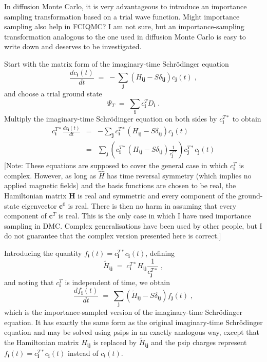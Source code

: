 \documentclass{article}
\newcommand{\bi}{\boldsymbol{i}}
\newcommand{\bj}{\boldsymbol{j}}
\newcommand{\bH}{\boldsymbol{H}}
\newcommand{\bc}{\boldsymbol{c}}
\begin{document}
In diffusion Monte Carlo, it is very advantageous to introduce an
importance sampling transformation based on a trial wave
function. Might importance sampling also help in FCIQMC? I am not
sure, but an importance-sampling transformation analogous to the one
used in diffusion Monte Carlo is easy to write down and deserves to be
investigated.

Start with the matrix form of the imaginary-time Schr\"{o}dinger
equation
\begin{displaymath}
\frac{dc_{\bi}(t)}{dt} \; = \;
- \sum_{\bj} \left ( H_{\bi\bj} - S \delta_{\bi\bj} \right )c_{\bj}(t)
\;,
\end{displaymath}
and choose a trial ground state
\begin{displaymath}
\Psi_T \; = \; \sum_{\bi} c_{\bi}^T D_{\bi}^{\,} \;.
\end{displaymath}
Multiply the imaginary-time Schr\"{o}dinger equation on both sides by
$c_{\bi}^{T\ast}$ to obtain
\begin{eqnarray*}
c_{\bi}^{T\ast} \frac{dc_{\bi}(t)}{dt} & = & 
- \sum_{\bj} c_{\bi}^{T\ast} ( H_{\bi\bj} -
S\delta_{\bi\bj} ) c_{\bj}(t) \\
& = & \sum_{\bj} \left ( c_{\bi}^{T\ast} ( H_{\bi\bj} - S\delta_{\bi\bj} )
\frac{1}{c_{\bj}^{T\ast}} \right ) c_{\bj}^{T\ast} c_{\bj}^{\,}(t)
\end{eqnarray*}
[Note: These equations are supposed to cover the general case in which
$c_{\bi}^{T}$ is complex. However, as long as $\hat{H}$ has time
reversal symmetry (which implies no applied magnetic fields) and the
basis functions are chosen to be real, the Hamiltonian matrix $\bH$ is
real and symmetric and every component of the ground-state eigenvector
$\bc^{0}$ is real. There is then no harm in assuming that every
component of $\bc^{T}$ is real. This is the only case in which I have
used importance sampling in DMC. Complex generalisations have been
used by other people, but I do not guarantee that the complex version
presented here is correct.] 

Introducing the quantity $f_{\bi}(t) = c_{\bi}^{T\ast}
c_{\bi}^{\,}(t)$, defining
\begin{displaymath}
\tilde{H}_{\bi\bj} \; = \; c_{\bi}^{T\ast} H_{\bi\bj} \frac{1}{c_{\bj}^{T\ast}} \;,
\end{displaymath}
and noting that $c_{\bi}^T$ is independent of time, we obtain
\begin{displaymath}
\frac{df_{\bi}(t)}{dt} \; = \; 
\sum_{\bj} \left ( \tilde{H}_{\bi\bj} - S \delta_{\bi\bj} \right )
f_{\bj}(t) \;,
\end{displaymath}
which is the importance-sampled version of the imaginary-time
Schr\"{o}dinger equation.  It has exactly the same form as the
original imaginary-time Schr\"{o}dinger equation and may be solved
using psips in an exactly analogous way, except that the Hamiltonian
matrix $H_{\bi\bj}$ is replaced by $\tilde{H}_{\bi\bj}$ and the psip
charges represent $f_{\bi}(t) = c_{\bi}^{T\ast} c_{\bi}^{\,}(t)$
instead of $c_{\bi}(t)$.
\end{document}

